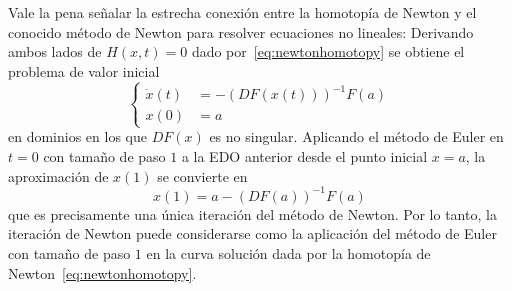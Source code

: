 \begin{frame}
	Vale la pena señalar la estrecha conexión entre la homotopía de
	Newton y el conocido método de Newton para resolver ecuaciones no
	lineales: Derivando ambos lados de $H\left(x,t\right)=0$ dado
	por~\eqref{eq:newtonhomotopy} se obtiene el problema de valor
	inicial
	\begin{equation*}
		\left\{
		\begin{aligned}
			\dot{x}\left(t\right) & =
			-{\left(DF\left(x\left(t\right)\right)\right)}^{-1}
			F\left(a\right)            \\
			x\left(0\right)       & =a
		\end{aligned}
		\right.
	\end{equation*}
	en dominios en los que $DF\left(x\right)$ es no singular.
	Aplicando el \alert{método de Euler} en $t=0$ con tamaño de paso
	$1$ a la EDO anterior desde el punto inicial $x=a$, la aproximación
	de $x\left(1\right)$ se convierte en
	\begin{equation*}
		x\left(1\right)=
		a-{\left(DF\left(a\right)\right)}^{-1}F\left(a\right)
	\end{equation*}
	que es precisamente una única iteración del método de Newton.
	Por lo tanto, la iteración de Newton puede considerarse como la
	aplicación del método de Euler con tamaño de paso $1$ en la curva
	solución dada por la homotopía de Newton~\eqref{eq:newtonhomotopy}.
\end{frame}

